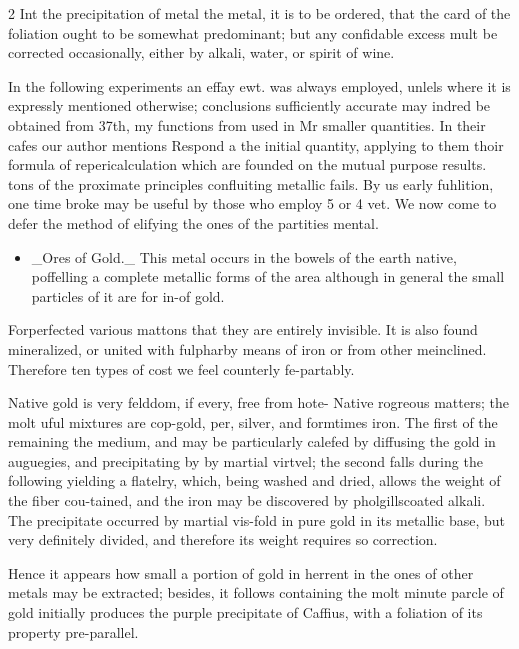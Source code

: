 \documentclass[10pt]{article}
\begin{document}
\begin{multicols}{2}
Int the precipitation of metal the metal, it is to be ordered, that the card of the foliation ought to be somewhat predominant; but any confidable excess mult be corrected occasionally, either by alkali, water, or spirit of wine.

In the following experiments an effay ewt. was always employed, unlels where it is expressly mentioned otherwise; conclusions sufficiently accurate may indred be obtained from 37th, my functions from used in Mr smaller quantities. In their cafes our author mentions Respond a the initial quantity, applying to them thoir formula of repericalculation which are founded on the mutual purpose results. tons of the proximate principles confluiting metallic fails. By us early fuhlition, one time broke may be useful by those who employ 5 or 4 vet. We now come to defer the method of elifying the ones of the partities mental.

\begin{itemize}\setlength{\itemsep}{1pt}
\item \_Ores of Gold.\_ This metal occurs in the bowels of the earth native, poffelling a complete metallic forms of the area although in general the small particles of it are for in-of gold.
\end{itemize}
Forperfected various mattons that they are entirely invisible. It is also found mineralized, or united with fulpharby means of iron or from other meinclined. Therefore ten types of cost we feel counterly fe-partably.

Native gold is very felddom, if every, free from hote- Native rogreous matters; the molt uful mixtures are cop-gold, per, silver, and formtimes iron. The first of the remaining the medium, and may be particularly calefed by diffusing the gold in auguegies, and precipitating by by martial virtvel; the second falls during the following yielding a flatelry, which, being washed and dried, allows the weight of the fiber cou-tained, and the iron may be discovered by pholgillscoated alkali. The precipitate occurred by martial vis-fold in pure gold in its metallic base, but very definitely divided, and therefore its weight requires so correction.

Hence it appears how small a portion of gold in herrent in the ones of other metals may be extracted; besides, it follows containing the molt minute parcle of gold initially produces the purple precipitate of Caffius, with a foliation of its property pre-parallel.


\end{multicols}
\end{document}
